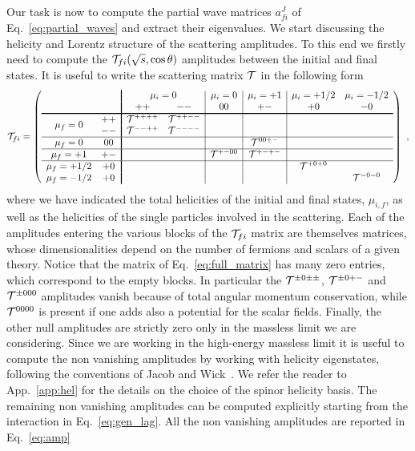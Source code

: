 \documentclass[a4paper,11pt]{article}
\newcommand\VRule[1][\arrayrulewidth]{\vrule width #1}
\newcommand{\be}{\begin{equation}}
\newcommand{\ee}{\end{equation}}
\begin{document}
Our task is now to compute the partial wave matrices $a_{fi}^J$ of Eq.~\eqref{eq:partial_waves} and extract their eigenvalues. We start discussing the helicity and Lorentz structure of the scattering amplitudes. To this end we firstly need to compute the ${\cal T}_{fi}(\sqrt s,\cos\theta)$ amplitudes between the initial and final states. It is useful to write the scattering matrix ${\cal T}$ in the following form
\vskip 10pt
\be\label{eq:full_matrix}
    {\cal T}_{fi} =
     \left(
    \begin{array}{c c !{\VRule[1pt]}c c|c|c|c c}
           &     &   \multicolumn{2}{c|}{\mu_i=0} &  \mu_i=0 &  \mu_i=+1 &  \mu_i=+1/2 &  \mu_i=-1/2 \\
         &  &  ++ 				& -- & 00 & +- & +0 & -0 \\
\specialrule{1pt}{0pt}{0pt}
\multirow{2}{*}{$\mu_f=0$} & ++   & {\cal T}^{++++}	 & {\bf {\cal T}}^{++--}  &  &  &  &  \\
 &--   & {\cal T}^{--++} 	 & {\bf {\cal T}}^{----}  &  &  &  &  \\
\hline
\mu_f=0 &00   &  	 &  &  & {\bf {\cal T}}^{00+-} &  &  \\
\hline
\mu_f=+1 &+-   &  	&   &{\bf {\cal T}}^{+-00}  & {\bf {\cal T}}^{+-+-} &   & \\
\hline
\mu_f=+1/2 &+0  &  	&   &  &   & {\bf {\cal T}}^{+0+0} & \\
\mu_f=-1/2  &+0  &  	&   &  &   & & {\bf {\cal T}}^{-0-0} \\
    \end{array}
    \right) \ ,
\ee
\vskip 10pt
\noindent where we have indicated the total helicities of the initial and final states, $\mu_{i,f}$, as well as the helicities of the single particles involved in the scattering. Each of the amplitudes entering the various blocks of the ${\cal T}_{fi}$ matrix are themselves matrices, whose dimensionalities depend on the number of fermions and scalars of a given theory. Notice that the matrix of 
Eq.~\eqref{eq:full_matrix} has many zero entries, which correspond to the empty blocks. In particular the ${\cal T}^{\pm0\pm\pm}$, ${\cal T}^{\pm0+-}$  and ${\cal T}^{\pm000}$ 
amplitudes vanish because of total angular momentum conservation, while ${\cal T}^{0000}$ is present if one adds also a potential for the scalar fields. Finally, the other null amplitudes are strictly zero only in the massless limit we are considering. Since we are working in the high-energy massless limit it is useful to compute the non vanishing amplitudes by working with helicity eigenstates, following the conventions of Jacob and Wick~\cite{Jacob:1959at}. We refer the reader to App.~\ref{app:hel} for the details on the choice of the spinor helicity basis.  The remaining non vanishing amplitudes can be computed explicitly starting from the interaction in Eq.~\eqref{eq:gen_lag}. 
All the non vanishing amplitudes are reported in Eq.~\eqref{eq:amp}
\end{document}
